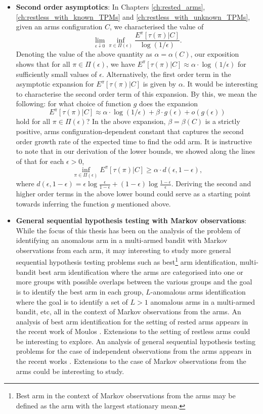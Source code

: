 \begin{itemize}
\item \textbf{Second order asymptotics}: In Chapters \ref{ch:rested_arms}, \ref{ch:restless_with_known_TPMs} and \ref{ch:restless_with_unknown_TPMs}, given an arms configuration $C$, we characterised the value of $$ \lim\limits_{\epsilon\downarrow 0}  \inf\limits_{\pi\in \Pi(\epsilon)} \frac{E^{\pi}[\tau(\pi)|C]}{\log (1/\epsilon)}.$$ Denoting the value of the above quantity as $\alpha=\alpha(C)$, our exposition shows that for all $\pi\in \Pi(\epsilon)$, we have $E^{\pi}[\tau(\pi)|C]\approx \alpha\cdot \log (1/\epsilon)$ for sufficiently small values of $\epsilon$. Alternatively, the first order term in the asymptotic expansion for $E^{\pi}[\tau(\pi)|C]$ is given by $\alpha$. It would be interesting to characterise the second order term of this expansion. By this, we mean the following: for what choice of function $g$ does the expansion $$ E^{\pi}[\tau(\pi)|C]\approx \alpha\cdot \log (1/\epsilon) + \beta\cdot g(\epsilon) + o(g(\epsilon)) $$ hold for all $\pi\in \Pi(\epsilon)$? In the above expansion, $\beta=\beta(C)$ is a strictly positive, arms configuration-dependent constant that captures the second order growth rate of the expected time to find the odd arm. It is instructive to note that in our derivation of the lower bounds, we showed along the lines of \cite{kaufmann2016complexity} that for each $\epsilon>0$, $$ \inf\limits_{\pi\in\Pi(\epsilon)}E^{\pi}[\tau(\pi)|C]\geq \alpha\cdot  d(\epsilon, 1-\epsilon), $$ where $d(\epsilon, 1-\epsilon)=\epsilon \log \frac{\epsilon}{1-\epsilon}+(1-\epsilon)\log \frac{1-\epsilon}{\epsilon}$. Deriving the second and higher order terms in the above lower bound could serve as a starting point towards inferring the function $g$ mentioned above.
  
\item \textbf{General sequential hypothesis testing with Markov observations}: While the focus of this thesis has been on the analysis of the problem of identifying an anomalous arm in a multi-armed bandit with Markov observations from each arm, it may interesting to study more general sequential hypothesis testing problems such as best\footnote{Best arm in the context of Markov observations from the arms may be defined as the arm with the largest stationary mean.} arm identification, multi-bandit best arm identification \cite{scarlett2019overlapping} where the arms are categorised into one or more groups with possible overlaps between the various groups and the goal is to identify the best arm in each group, $L$-anomalous arms identification where the goal is to identify a set of $L> 1$ anomalous arms in a multi-armed bandit, etc, all in the context of Markov observations from the arms. An analysis of best arm identification for the setting of rested arms appears in the recent work of Moulos \cite{moulos2019optimal}. Extensions to the setting of restless arms could be interesting to explore. An analysis of general sequential hypothesis testing problems for the case of independent observations from the arms appears in the recent works \cite{deshmukh2019sequential, prabhu2020sequential}. Extensions to the case of Markov observations from the arms could be interesting to study.


\end{itemize}
